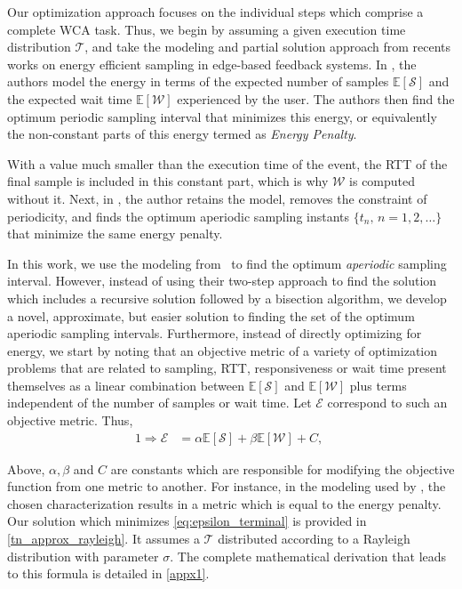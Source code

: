 Our optimization approach focuses on the individual steps which comprise a complete \ac{WCA} task.
Thus, we begin by assuming a given execution time distribution \( \mathcal{T} \), and take the modeling and partial solution approach from recents works on energy efficient sampling in edge-based feedback systems.
In \textcite{Moothedath2021EnergyOptimal,Moothedath2022EnergyEfficient}, the authors model the energy in terms of the expected number of samples $\mathbb{E}[\mathcal{S}]$ and the expected wait time $\mathbb{E}[\mathcal{W}]$ experienced by the user.
The authors then find the optimum periodic sampling interval that minimizes this energy, or equivalently the non-constant parts of this energy termed as \textit{Energy Penalty}.

With a value much smaller than the execution time of the event, the \ac{RTT} of the final sample is included in this constant part, which is why $\mathcal{W}$ is computed without it.
Next, in \textcite{Moothedath2022Aperiodic}, the author retains the model, removes the constraint of periodicity, and finds the optimum aperiodic sampling instants $\{t_n,\,n=1,2,\dots\}$ that minimize the same energy penalty.

In this work, we use the modeling from~\cite{Moothedath2022Aperiodic} to find the optimum \emph{aperiodic} sampling interval.
However, instead of using their two-step approach to find the solution which includes a recursive solution followed by a bisection algorithm, we develop a novel, approximate, but easier solution to finding the set of the optimum aperiodic sampling intervals.
Furthermore, instead of directly optimizing for energy, we start by noting that an objective metric of a variety of optimization problems that are related to sampling, RTT, responsiveness or wait time present themselves 
as a linear combination between $\mathbb{E}[\mathcal{S}]$ and $\mathbb{E}[\mathcal{W}]$ plus terms independent of the number of samples or wait time.
Let $\mathcal{E}$ correspond to such an objective metric.
Thus, 
\begin{alignat}{1}
    \Rightarrow\mathcal{E}&=\alpha\mathbb{E}[\mathcal{S}]+\beta\mathbb{E}[\mathcal{W}]+C,\;\label{eq:epsilon_terminal}
\end{alignat}

Above, $\alpha, \beta$ and $C$ are constants which are responsible for modifying the objective function from one metric to another.
For instance, in the modeling used by \textcite{Moothedath2021EnergyOptimal,Moothedath2022EnergyEfficient,Moothedath2022Aperiodic}, the chosen characterization results in a metric which is equal to the energy penalty.
Our solution which minimizes \cref{eq:epsilon_terminal} is provided in \cref{tn_approx_rayleigh}.
It assumes a $\mathcal{T}$ distributed according to a Rayleigh distribution with parameter $\sigma$.
The complete mathematical derivation that leads to this formula is detailed in \cref{appx1}.

